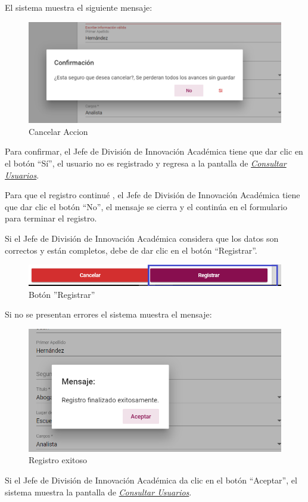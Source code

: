 El sistema muestra el siguiente mensaje:


\begin{figure}[H]
	\centering
	\includegraphics[width=0.4\linewidth]{images/SP5/MSG29}
	\caption{Cancelar Accion}
	\label{mensaje29}
\end{figure}

Para confirmar, el Jefe de División de Innovación Académica  tiene que dar clic en el botón “Sí”, el usuario no es registrado y regresa a la pantalla de \hyperlink{consultarUs}{\textit{Consultar Usuarios}}.

Para que el registro continué , el Jefe de División de Innovación Académica  tiene que  dar clic el botón “No”, el mensaje se  cierra  y el continúa en el formulario para terminar el registro.

Si el Jefe de División de Innovación Académica  considera que los datos son correctos y están completos, debe de dar clic en el botón “Registrar”.

\begin{figure}[H]
	\centering
	\hypertarget{btnreg}{\includegraphics[width=0.7\linewidth]{images/SP5/BtnRegistrar}}
	\caption{Botón ''Registrar''}
	\label{btnreg}
\end{figure}

Si no se presentan errores el sistema muestra el mensaje:


\begin{figure}[H]
	\centering
	\includegraphics[width=0.4\linewidth]{images/SP5/MSG5}
	\caption{Registro exitoso}
	\label{mensaje5}
	
\end{figure}

Si el Jefe de División de Innovación Académica   da clic en el botón “Aceptar”, el sistema muestra la pantalla de  \hyperlink{consultarUs}{\textit{Consultar Usuarios}}.

